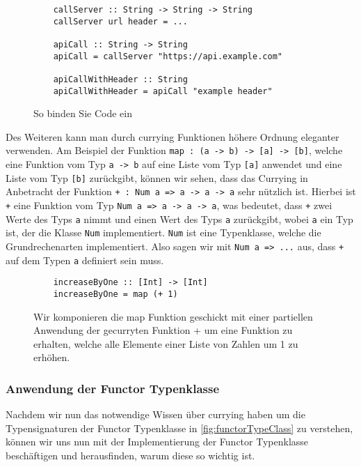 \documentclass{hhuarticle}
\theoremstyle{definition}
\theoremstyle{theorem}
\begin{document}
  \begin{figure}[h]

    \begin{verbatim}
    callServer :: String -> String -> String
    callServer url header = ...

    apiCall :: String -> String
    apiCall = callServer "https://api.example.com"

    apiCallWithHeader :: String
    apiCallWithHeader = apiCall "example header"
    \end{verbatim}
    \caption{So binden Sie Code ein}%
    \label{fig:curryingExample}
  \end{figure}

  Des Weiteren kann man durch currying Funktionen höhere Ordnung
  eleganter verwenden. Am Beispiel der Funktion \verb|map : (a -> b) -> [a] -> [b]|,
  welche eine Funktion vom Typ \verb|a -> b| auf eine Liste vom Typ \verb|[a]| anwendet
  und eine Liste vom Typ \verb|[b]| zurückgibt, können wir sehen, dass
  das Currying in Anbetracht der Funktion \verb|+ : Num a => a -> a -> a| sehr nützlich ist.
  Hierbei ist \verb|+| eine Funktion vom Typ \verb|Num a => a -> a -> a|,
  was bedeutet, dass \verb|+| zwei Werte des Typs \verb|a| nimmt und einen Wert
  des Typs \verb|a| zurückgibt, wobei \verb|a| ein Typ ist, der die Klasse \verb|Num| implementiert.
  \verb|Num| ist eine Typenklasse, welche die Grundrechenarten implementiert.
  Also sagen wir mit \verb|Num a => ...| aus, dass \verb|+| auf dem
  Typen \verb|a| definiert sein muss.

  \begin{figure}[h]

    \begin{verbatim}
    increaseByOne :: [Int] -> [Int]
    increaseByOne = map (+ 1)
    \end{verbatim}
    \caption{Wir komponieren die map Funktion geschickt mit einer partiellen Anwendung der gecurryten Funktion + um eine Funktion zu erhalten, welche alle Elemente einer Liste von Zahlen um 1 zu erhöhen.}%
    \label{fig:currying1}
  \end{figure}

  \subsubsection{Anwendung der Functor Typenklasse}

  Nachdem wir nun das notwendige Wissen über currying haben um 
  die Typensignaturen der Functor Typenklasse in \cref{fig:functorTypeClass}
  zu verstehen, können wir uns nun mit der Implementierung der Functor Typenklasse
  beschäftigen und herausfinden, warum diese so wichtig ist.
\end{document}
